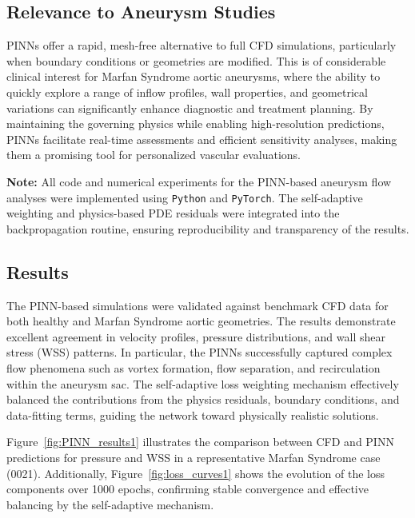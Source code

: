 \documentclass[12pt, a4paper]{article}
\begin{document}
\subsection{Relevance to Aneurysm Studies}
PINNs offer a rapid, mesh-free alternative to full CFD simulations, particularly when boundary conditions or geometries are modified. This is of considerable clinical interest for Marfan Syndrome aortic aneurysms, where the ability to quickly explore a range of inflow profiles, wall properties, and geometrical variations can significantly enhance diagnostic and treatment planning. By maintaining the governing physics while enabling high-resolution predictions, PINNs facilitate real-time assessments and efficient sensitivity analyses, making them a promising tool for personalized vascular evaluations.

\vspace{2em}
\noindent\textbf{Note:} All code and numerical experiments for the PINN-based aneurysm flow analyses were implemented using \texttt{Python} and \texttt{PyTorch}. The self-adaptive weighting and physics-based PDE residuals were integrated into the backpropagation routine, ensuring reproducibility and transparency of the results.

\subsection{Results}
\label{sec:PINN_Results}
The PINN-based simulations were validated against benchmark CFD data for both healthy and Marfan Syndrome aortic geometries. The results demonstrate excellent agreement in velocity profiles, pressure distributions, and wall shear stress (WSS) patterns. In particular, the PINNs successfully captured complex flow phenomena such as vortex formation, flow separation, and recirculation within the aneurysm sac. The self-adaptive loss weighting mechanism effectively balanced the contributions from the physics residuals, boundary conditions, and data-fitting terms, guiding the network toward physically realistic solutions.

Figure~\ref{fig:PINN_results1} illustrates the comparison between CFD and PINN predictions for pressure and WSS in a representative Marfan Syndrome case (0021). Additionally, Figure~\ref{fig:loss_curves1} shows the evolution of the loss components over 1000 epochs, confirming stable convergence and effective balancing by the self-adaptive mechanism.
\end{document}
